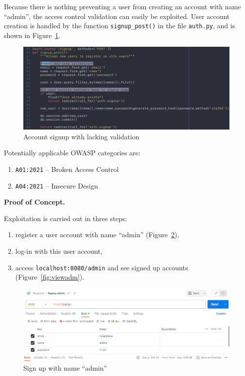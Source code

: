 \documentclass[parskip=half]{scrartcl}
\newcommand{\figref}[1]{Figure~\ref{#1}}
\begin{document}
Because there is nothing preventing a user from creating an account with name
``admin'', the access control validation can easily be exploited. User account
creation is handled by the function \texttt{signup\_post()} in the file
\texttt{auth.py}, and is shown in \figref{fig:code:signup}.

\begin{figure}[h]
    \centering
    \includegraphics[width=\textwidth]{code_acccreate}
    \caption{Account signup with lacking validation}
    \label{fig:code:signup}
\end{figure}

Potentially applicable OWASP categories are:
\begin{enumerate}
  \item \texttt{A01:2021} -- Broken Access Control%
  \item \texttt{A04:2021} -- Insecure Design%
\end{enumerate}

\textbf{Proof of Concept.}

Exploitation is carried out in three steps:
\begin{enumerate}
    \item register a user account with name ``admin'' (\figref{fig:sigadm}),
    \item log-in with this user account,
    \item access \texttt{localhost:8080/admin} and see signed up accounts
    (\figref{fig:viewadm}).
\end{enumerate}

\begin{figure}[h]
    \centering
    \includegraphics[width=\textwidth]{signup_admin}
    \caption{Sign up with name ``admin''}
    \label{fig:sigadm}
\end{figure}
\end{document}

